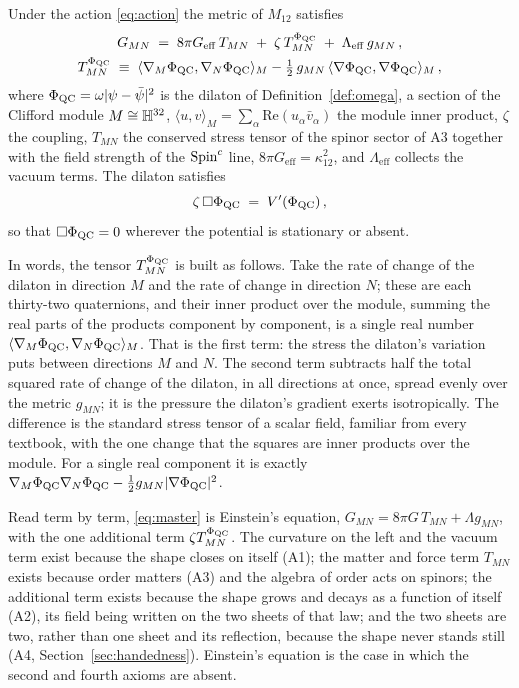 \begin{theorem}\label{thm:master}
Under the action \eqref{eq:action} the metric of $M_{12}$ satisfies
\begin{equation}\label{eq:master}
\begin{gathered}
  G_{MN}\;=\;8\pi G_{\mathrm{eff}}\,T_{MN}\;+\;\zeta\,T^{\Phi_{\mathrm{QC}}}_{MN}\;+\;\Lambda_{\mathrm{eff}}\,g_{MN}\,,\\
  T^{\Phi_{\mathrm{QC}}}_{MN}\;\equiv\;\langle\nabla_{M}\Phi_{\mathrm{QC}},\nabla_{N}\Phi_{\mathrm{QC}}\rangle_{M}-\tfrac12\,g_{MN}\,\langle\nabla\Phi_{\mathrm{QC}},\nabla\Phi_{\mathrm{QC}}\rangle_{M}\,,
\end{gathered}
\end{equation}
where $\Phi_{\mathrm{QC}}=\omega\lvert\psi-\bar\psi\rvert^{2}$ is the dilaton of
Definition~\ref{def:omega}, a section of the Clifford module $M\cong\mathbb{H}^{32}$,
$\langle u,v\rangle_{M}=\sum_{\alpha}\mathrm{Re}(u_{\alpha}\bar v_{\alpha})$ the
module inner product, $\zeta$ the coupling, $T_{MN}$ the conserved
stress tensor of the spinor sector of A3 together with the field strength
of the $\text{Spin}^c$ line, $8\pi G_{\mathrm{eff}}=\kappa_{12}^{2}$, and
$\Lambda_{\mathrm{eff}}$ collects the vacuum terms. The dilaton satisfies
\begin{equation}\label{eq:dilaton}
  \zeta\,\Box\Phi_{\mathrm{QC}}\;=\;V'(\Phi_{\mathrm{QC}})\,,
\end{equation}
so that $\Box\Phi_{\mathrm{QC}}=0$ wherever the potential is stationary or absent.
\end{theorem}

In words, the tensor $T^{\Phi_{\mathrm{QC}}}_{MN}$ is built as follows. Take the rate of
change of the dilaton in direction $M$ and the rate of change in direction
$N$; these are each thirty-two quaternions, and their inner product over
the module, summing the real parts of the products component by component,
is a single real number $\langle\nabla_{M}\Phi_{\mathrm{QC}},\nabla_{N}\Phi_{\mathrm{QC}}\rangle_{M}$. That is
the first term: the stress the dilaton's variation puts between directions
$M$ and $N$. The second term subtracts half the total squared rate of change
of the dilaton, in all directions at once, spread evenly over the metric
$g_{MN}$; it is the pressure the dilaton's gradient exerts isotropically. The
difference is the standard stress tensor of a scalar field, familiar from
every textbook, with the one change that the squares are inner products
over the module. For a single real component it is exactly
$\nabla_{M}\Phi_{\mathrm{QC}}\nabla_{N}\Phi_{\mathrm{QC}}-\tfrac12g_{MN}\lvert\nabla\Phi_{\mathrm{QC}}\rvert^{2}$.

Read term by term, \eqref{eq:master} is Einstein's equation, $G_{MN}=8\pi G\,T_{MN}+\Lambda g_{MN}$,
with the one additional term $\zeta T^{\Phi_{\mathrm{QC}}}_{MN}$. The curvature on the
left and the vacuum term exist because the shape closes on itself (A1);
the matter and force term $T_{MN}$ exists because order matters (A3) and
the algebra of order acts on spinors; the additional term exists because
the shape grows and decays as a function of itself (A2), its field being
written on the two sheets of that law; and the two sheets are two, rather
than one sheet and its reflection, because the shape never stands still
(A4, Section~\ref{sec:handedness}). Einstein's equation is the case in
which the second and fourth axioms are absent.

